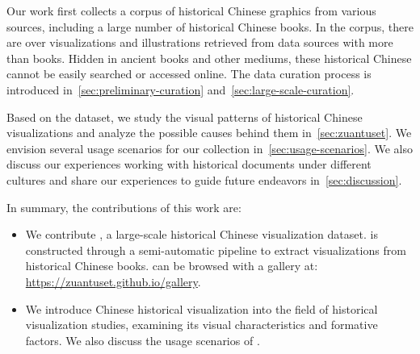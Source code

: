 Our work first collects a corpus of historical Chinese graphics from various sources, including a large number of historical Chinese books. 
In the corpus, there are over \numVisShort visualizations and \numIllusShort illustrations retrieved from data sources with more than \numBookShort books.
Hidden in ancient books and other mediums, these historical Chinese \itemTypePlural cannot be easily searched or accessed online.
The data curation process is introduced in~\cref{sec:preliminary-curation} and~\cref{sec:large-scale-curation}.

Based on the dataset, we study the visual patterns of historical Chinese visualizations and analyze the possible causes behind them in~\cref{sec:zuantuset}.
We envision several usage scenarios for our collection in~\cref{sec:usage-scenarios}. 
We also discuss our experiences working with historical documents under different cultures and share our experiences to guide future endeavors in~\cref{sec:discussion}.

In summary, the contributions of this work are:

\begin{itemize}[leftmargin=3.5mm]
    \item We contribute \datasetName, a large-scale historical Chinese visualization dataset.
        \datasetName is constructed through a semi-automatic pipeline to extract visualizations from historical Chinese books.
        \datasetName can be browsed with a gallery at: \url{https://zuantuset.github.io/gallery}.

    \item We introduce Chinese historical visualization into the field of historical visualization studies, examining its visual characteristics and formative factors. We also discuss the usage scenarios of \datasetName.
      
\end{itemize}




